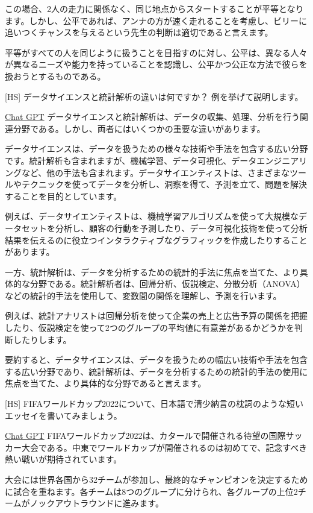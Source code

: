 \documentclass[
]{book}
\theoremstyle{definition}
\theoremstyle{definition}
\theoremstyle{definition}
\theoremstyle{definition}
\theoremstyle{remark}
\begin{document}
この場合、2人の走力に関係なく、同じ地点からスタートすることが平等となります。しかし、公平であれば、アンナの方が速く走れることを考慮し、ビリーに追いつくチャンスを与えるという先生の判断は適切であると言えます。

平等がすべての人を同じように扱うことを目指すのに対し、公平は、異なる人々が異なるニーズや能力を持っていることを認識し、公平かつ公正な方法で彼らを扱おうとするものである。

{[}HS{]} データサイエンスと統計解析の違いは何ですか？ 例を挙げて説明します。

\protect\hyperlink{chatgpt}{Chat GPT} データサイエンスと統計解析は、データの収集、処理、分析を行う関連分野である。しかし、両者にはいくつかの重要な違いがあります。

データサイエンスは、データを扱うための様々な技術や手法を包含する広い分野です。統計解析も含まれますが、機械学習、データ可視化、データエンジニアリングなど、他の手法も含まれます。データサイエンティストは、さまざまなツールやテクニックを使ってデータを分析し、洞察を得て、予測を立て、問題を解決することを目的としています。

例えば、データサイエンティストは、機械学習アルゴリズムを使って大規模なデータセットを分析し、顧客の行動を予測したり、データ可視化技術を使って分析結果を伝えるのに役立つインタラクティブなグラフィックを作成したりすることがあります。

一方、統計解析は、データを分析するための統計的手法に焦点を当てた、より具体的な分野である。統計解析者は、回帰分析、仮説検定、分散分析（ANOVA）などの統計的手法を使用して、変数間の関係を理解し、予測を行います。

例えば、統計アナリストは回帰分析を使って企業の売上と広告予算の関係を把握したり、仮説検定を使って2つのグループの平均値に有意差があるかどうかを判断したりします。

要約すると、データサイエンスは、データを扱うための幅広い技術や手法を包含する広い分野であり、統計解析は、データを分析するための統計的手法の使用に焦点を当てた、より具体的な分野であると言えます。

{[}HS{]} FIFAワールドカップ2022について、日本語で清少納言の枕詞のような短いエッセイを書いてみましょう。

\protect\hyperlink{chatgpt}{Chat GPT} FIFAワールドカップ2022は、カタールで開催される待望の国際サッカー大会である。中東でワールドカップが開催されるのは初めてで、記念すべき熱い戦いが期待されています。

大会には世界各国から32チームが参加し、最終的なチャンピオンを決定するために試合を重ねます。各チームは8つのグループに分けられ、各グループの上位2チームがノックアウトラウンドに進みます。
\end{document}

